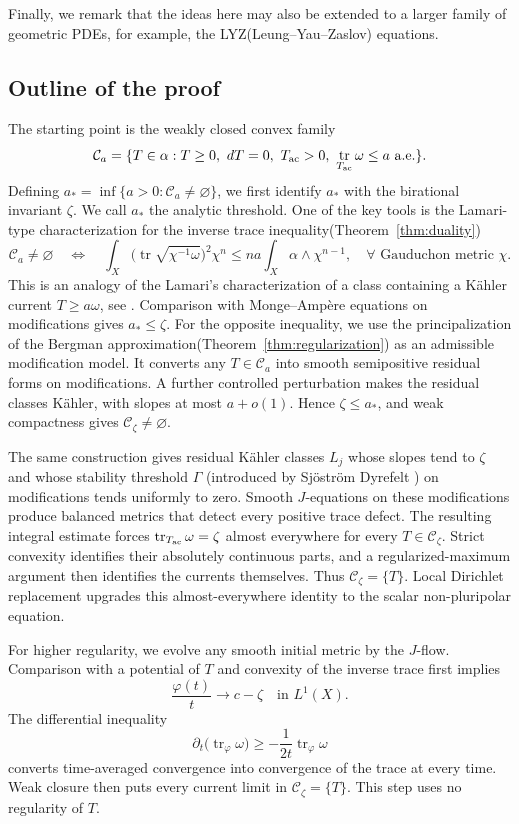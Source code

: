\documentclass[reqno]{amsart}
\numberwithin{equation}{section}
\theoremstyle{definition}
\DeclareMathOperator{\tr}{tr}
\newcommand{\cC}{\mathcal C}
\begin{document}
Finally, we remark that the ideas here may also be extended to a larger family of geometric PDEs, for example, the LYZ(Leung--Yau--Zaslov) equations.  

\subsection*{Outline of the proof}
The starting point is the weakly closed convex family
\[
 \mathcal C_a=\{T\in\alpha:T\ge0,\ dT=0,
       \ T_{\rm ac}>0,\ \tr_{T_{\rm ac}}\omega\le a\text{ a.e.}\}.
\]
Defining $a_*=\inf\{a>0:\mathcal C_a\ne\varnothing\}$,
we first identify $a_*$ with the birational invariant $\zeta$. We call $a_*$ the analytic threshold. 
One of the key tools is the Lamari-type characterization for the inverse trace inequality(Theorem~\ref{thm:duality})
\[
\cC_a\neq \varnothing\quad \Leftrightarrow\quad \int_X\bigl(\tr\sqrt{\chi^{-1}\omega}\bigr)^2\chi^n
 \le na\int_X\alpha\wedge\chi^{n-1},\quad \forall \text{ Gauduchon metric }\chi.
\]
This is an analogy of the Lamari's characterization of a class containing a K\"ahler current $T\geq a\omega$, see \cite{L99,Tosatti16}. 
Comparison with Monge--Amp\`ere equations on modifications gives
$a_*\le\zeta$. For the opposite inequality, we use the principalization of the Bergman approximation(Theorem~\ref{thm:regularization}) as an admissible modification model.  It converts any
$T\in\mathcal C_a$ into smooth semipositive residual forms
on modifications. A further controlled perturbation makes the
residual classes K\"ahler, with slopes at most $a+o(1)$.
Hence $\zeta\le a_*$, and weak compactness gives
$\mathcal C_\zeta\ne\varnothing$.

The same construction gives residual K\"ahler
classes $L_j$ whose slopes tend to $\zeta$ and whose
stability threshold $\Gamma$ (introduced by Sjöström Dyrefelt \cite{SD20}) on modifications tends uniformly to zero.
Smooth $J$-equations on these modifications produce balanced
metrics that detect every positive trace defect. The resulting
integral estimate forces
$\tr_{T_{\rm ac}}\omega=\zeta$ almost everywhere for every
$T\in\mathcal C_\zeta$. Strict convexity identifies their
absolutely continuous parts, and a regularized-maximum argument
then identifies the currents themselves. Thus
$\mathcal C_\zeta=\{T\}$. Local Dirichlet replacement upgrades
this almost-everywhere identity to the scalar non-pluripolar
equation. 

For higher regularity, we evolve any smooth initial metric by the
$J$-flow. Comparison with a potential of $T$ and convexity of the
inverse trace first implies 
\[
 \frac{\varphi(t)}t\longrightarrow c-\zeta\quad\text{in }L^1(X).
\]
The differential inequality
\[
 \partial_t\bigl(\tr_{\varphi}\omega\bigr)
 \ge-\frac1{2t}\tr_{\varphi}\omega
\]
converts time-averaged convergence into convergence of the trace at
every time. Weak closure then puts every current limit in
$\mathcal C_\zeta=\{T\}$. This step uses no regularity of $T$.
\end{document}
